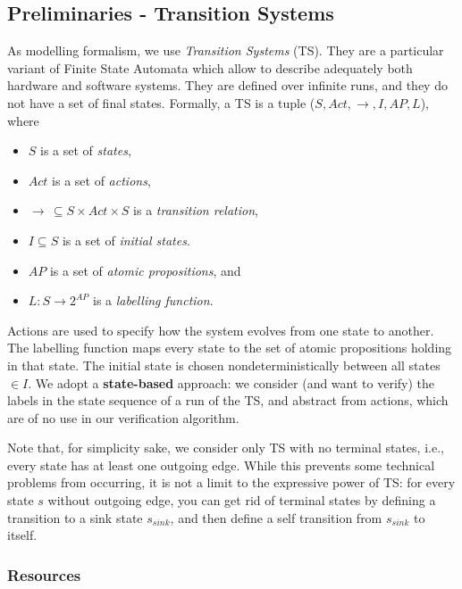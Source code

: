 \documentclass{article}
\begin{document}
\subsection{Preliminaries - Transition Systems}
\label{subsec-ts}
As modelling formalism, we use \emph{Transition Systems} (TS). They are a particular variant 
of Finite State Automata which allow to describe adequately both hardware and software systems. 
They are defined over infinite runs, and they do not have a set of final states. 
Formally, a TS is a tuple ($S, Act, \rightarrow, I, AP, L$), where 
\begin{itemize}
    \item $S$ is a set of \emph{states},
    \item $Act$ is a set of \emph{actions},
    \item $\longrightarrow\,\subseteq S \times Act \times S$ is a \emph{transition relation},
    \item $I \subseteq S$ is a set of \emph{initial states}.
    \item $AP$ is a set of \emph{atomic propositions}, and 
    \item $L : S \rightarrow 2^{AP}$ is a \emph{labelling function}.
\end{itemize}
Actions are used to specify how the system evolves from one state to another. The labelling function maps every state to the set of atomic propositions holding in that state. The initial state is chosen nondeterministically between all states $\in I$.
We adopt a \textbf{state-based} approach: we consider (and want to verify) the labels in the state sequence of a run of the TS, and abstract from actions, which are of no use in our verification algorithm. 

Note that, for simplicity sake, we consider only TS with no terminal states, i.e., every state has at least one outgoing edge. While this prevents some technical problems from occurring, it is not a limit to the expressive power of TS: for every state $s$ without outgoing edge, you can get rid of terminal states by defining a transition to a sink state $s_ {sink}$, and then define a self transition from $s_ {sink}$ to itself.

\subsubsection*{Resources}
\cite[Paragraph 2.1]{BaKa}
\end{document}
